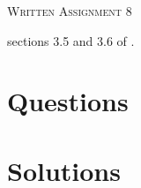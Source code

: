 \documentclass{article}
\title{}
\date{}
\begin{document}
\begin{center}
\textsc{\LARGE Written Assignment 8}\\[0.5cm]
\end{center}
\From sections 3.5 and 3.6 of \VCT.
\section*{Questions}
\BEN

\item %

\EEN %

%
%
% 

\newpage
\section*{Solutions}

\BEN
\EEN %
\end{document}
